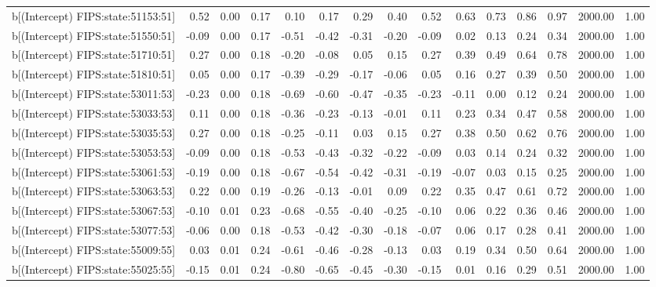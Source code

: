 \begin{table}[ht]
\begin{tabular}{rrrrrrrrrrrrrrr}
  b[(Intercept) FIPS:state:51153:51] & 0.52 & 0.00 & 0.17 & 0.10 & 0.17 & 0.29 & 0.40 & 0.52 & 0.63 & 0.73 & 0.86 & 0.97 & 2000.00 & 1.00 \\ 
  b[(Intercept) FIPS:state:51550:51] & -0.09 & 0.00 & 0.17 & -0.51 & -0.42 & -0.31 & -0.20 & -0.09 & 0.02 & 0.13 & 0.24 & 0.34 & 2000.00 & 1.00 \\ 
  b[(Intercept) FIPS:state:51710:51] & 0.27 & 0.00 & 0.18 & -0.20 & -0.08 & 0.05 & 0.15 & 0.27 & 0.39 & 0.49 & 0.64 & 0.78 & 2000.00 & 1.00 \\ 
  b[(Intercept) FIPS:state:51810:51] & 0.05 & 0.00 & 0.17 & -0.39 & -0.29 & -0.17 & -0.06 & 0.05 & 0.16 & 0.27 & 0.39 & 0.50 & 2000.00 & 1.00 \\ 
  b[(Intercept) FIPS:state:53011:53] & -0.23 & 0.00 & 0.18 & -0.69 & -0.60 & -0.47 & -0.35 & -0.23 & -0.11 & 0.00 & 0.12 & 0.24 & 2000.00 & 1.00 \\ 
  b[(Intercept) FIPS:state:53033:53] & 0.11 & 0.00 & 0.18 & -0.36 & -0.23 & -0.13 & -0.01 & 0.11 & 0.23 & 0.34 & 0.47 & 0.58 & 2000.00 & 1.00 \\ 
  b[(Intercept) FIPS:state:53035:53] & 0.27 & 0.00 & 0.18 & -0.25 & -0.11 & 0.03 & 0.15 & 0.27 & 0.38 & 0.50 & 0.62 & 0.76 & 2000.00 & 1.00 \\ 
  b[(Intercept) FIPS:state:53053:53] & -0.09 & 0.00 & 0.18 & -0.53 & -0.43 & -0.32 & -0.22 & -0.09 & 0.03 & 0.14 & 0.24 & 0.32 & 2000.00 & 1.00 \\ 
  b[(Intercept) FIPS:state:53061:53] & -0.19 & 0.00 & 0.18 & -0.67 & -0.54 & -0.42 & -0.31 & -0.19 & -0.07 & 0.03 & 0.15 & 0.25 & 2000.00 & 1.00 \\ 
  b[(Intercept) FIPS:state:53063:53] & 0.22 & 0.00 & 0.19 & -0.26 & -0.13 & -0.01 & 0.09 & 0.22 & 0.35 & 0.47 & 0.61 & 0.72 & 2000.00 & 1.00 \\ 
  b[(Intercept) FIPS:state:53067:53] & -0.10 & 0.01 & 0.23 & -0.68 & -0.55 & -0.40 & -0.25 & -0.10 & 0.06 & 0.22 & 0.36 & 0.46 & 2000.00 & 1.00 \\ 
  b[(Intercept) FIPS:state:53077:53] & -0.06 & 0.00 & 0.18 & -0.53 & -0.42 & -0.30 & -0.18 & -0.07 & 0.06 & 0.17 & 0.28 & 0.41 & 2000.00 & 1.00 \\ 
  b[(Intercept) FIPS:state:55009:55] & 0.03 & 0.01 & 0.24 & -0.61 & -0.46 & -0.28 & -0.13 & 0.03 & 0.19 & 0.34 & 0.50 & 0.64 & 2000.00 & 1.00 \\ 
  b[(Intercept) FIPS:state:55025:55] & -0.15 & 0.01 & 0.24 & -0.80 & -0.65 & -0.45 & -0.30 & -0.15 & 0.01 & 0.16 & 0.29 & 0.51 & 2000.00 & 1.00 \\ 

\end{tabular}
\end{table}
